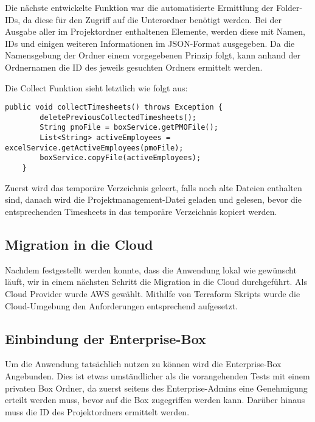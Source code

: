 Die nächste entwickelte Funktion war die automatisierte Ermittlung der Folder-IDs, da diese für den Zugriff auf die Unterordner benötigt werden. Bei der Ausgabe aller im Projektordner enthaltenen Elemente, werden diese mit Namen, IDs und einigen weiteren Informationen im \ac{JSON}-Format ausgegeben. Da die Namensgebung der Ordner einem vorgegebenen Prinzip folgt, kann anhand der Ordnernamen die ID des jeweils gesuchten Ordners ermittelt werden. \pagebreak

Die Collect Funktion sieht letztlich wie folgt aus:

\begin{lstlisting}[caption=collectTimesheets Funktion]
    public void collectTimesheets() throws Exception {
        deletePreviousCollectedTimesheets();
        String pmoFile = boxService.getPMOFile();
        List<String> activeEmployees = excelService.getActiveEmployees(pmoFile);
        boxService.copyFile(activeEmployees);
    }
\end{lstlisting}

Zuerst wird das temporäre Verzeichnis geleert, falls noch alte Dateien enthalten sind, danach wird die Projektmanagement-Datei geladen und gelesen, bevor die entsprechenden Timesheets in das temporäre Verzeichnis kopiert werden.

\subsection{Migration in die Cloud}
Nachdem festgestellt werden konnte, dass die Anwendung lokal wie gewünscht läuft, wir in einem nächsten Schritt die Migration in die Cloud durchgeführt. Als Cloud Provider wurde \ac{AWS} gewählt. Mithilfe von \gls{Terraform} Skripts wurde die Cloud-Umgebung den Anforderungen entsprechend aufgesetzt.

\subsection{Einbindung der Enterprise-Box}
Um die Anwendung tatsächlich nutzen zu können wird die Enterprise-Box Angebunden. Dies ist etwas umständlicher als die vorangehenden Tests mit einem privaten Box Ordner, da zuerst seitens des Enterprise-Admins eine Genehmigung erteilt werden muss, bevor auf die Box zugegriffen werden kann. Darüber hinaus muss die ID des Projektordners ermittelt werden.
\pagebreak
